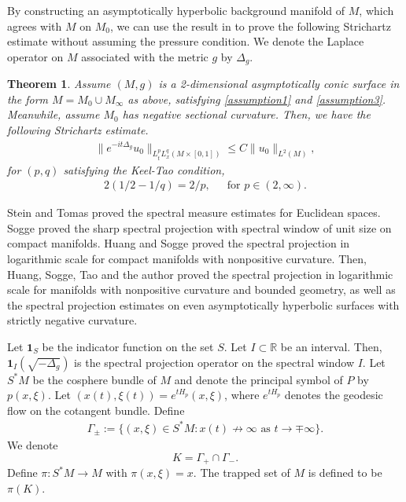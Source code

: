 \documentclass[11pt]{amsart}
\newtheorem{theorem}{Theorem}
\begin{document}
By constructing an asymptotically hyperbolic background manifold of $M$, which agrees with $M$ on $M_0$, we can use the result in \cite{HSTZ} to prove the following Strichartz estimate without assuming the pressure condition. We denote the Laplace operator on $M$ associated with the metric $g$ by $\Delta_g$. 
\begin{theorem}\label{Strichartzthm}
    Assume $(M,g)$ is a 2-dimensional asymptotically conic surface in the form $M=M_0\cup M_\infty$ as above, satisfying \eqref{assumption1} and \eqref{assumption3}. Meanwhile, assume $M_0$ has negative sectional curvature. Then, we have the following Strichartz estimate.
    \begin{align}\label{eq:thmstrichart}
    \|e^{-it\Delta_g}u_0\|_{L^p_tL^q_x(M\times [0,1])}\leq C \|u_0\|_{L^2(M)},
    \end{align}
    for $(p,q)$ satisfying the Keel-Tao condition,
    \begin{align}\label{keeltao}
        2(1/2-1/q)=2/p, \, \, 
\,\,\,\,\,\text{ for } p\in (2,\infty).
    \end{align}
\end{theorem}

Stein \cite{Stein} and Tomas \cite{Thomas} proved the spectral measure estimates for Euclidean spaces. Sogge \cite{sogge88} proved the sharp spectral projection with spectral window of unit size on compact manifolds. Huang and Sogge \cite{SoggeHuangQuasimode2025} proved the spectral projection in logarithmic scale for compact manifolds with nonpositive curvature. Then, Huang, Sogge, Tao and the author \cite{HSTZ} proved the spectral projection in logarithmic scale for manifolds with nonpositive curvature and bounded geometry, as well as the spectral projection estimates on even asymptotically hyperbolic surfaces with strictly negative curvature. 

Let $\mathbf{1}_S$ be the indicator function on the set $S.$ Let $I\subset\mathbb{R}$ be an interval. Then, $\mathbf{1}_{I}(\sqrt{-\Delta_g})$ is the spectral projection operator on the spectral window $I$. Let $S^*M$ be the cosphere bundle of $M$ and denote the principal symbol of $P$ by $p(x,\xi)$. Let $(x(t),\xi(t))=e^{tH_p}(x,\xi)$, where $e^{tH_p}$ denotes the geodesic flow on the cotangent bundle. Define \begin{align}
     \Gamma_\pm:=\{(x,\xi)\in S^*M:x(t)\not\to\infty \text{ as }t\to\mp\infty\}.
 \end{align}
We denote $$K=\Gamma_+\cap\Gamma_-.$$ Define $\pi:S^*M\to M$ with $\pi(x,\xi)=x.$ The trapped set of $M$ is defined to be $\pi(K)$.
\end{document}
